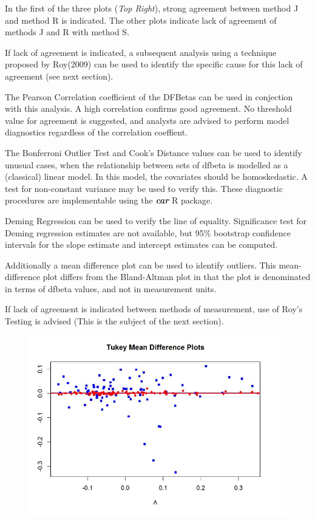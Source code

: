 \documentclass[12pt, a4paper]{report}
\theoremstyle{plain}
\theoremstyle{definition}
\theoremstyle{remark}
\begin{document}
	In the first of the three plots (\textit{Top Right}), strong agreement between method J and method R is indicated. The other plots indicate lack of agreement of methods J and R with method S.
	
	
	
	If lack of agreement is indicated, a subsequent analysis using a technique proposed by Roy(2009) can be used to identify the specific cause for this lack of agreement (see next section).
	
	
	The Pearson Correlation coefficient of the DFBetas can be used in conjection with this analysis. A high correlation confirms good agreement. No threshold value for agreement is suggested, and analysts are advised to perform model diagnostics regardless of the correlation coeffient.
	
	
	The Bonferroni Outlier Test and Cook's Distance values can be used to identify unusual cases, when the relationship between sets of dfbeta is modelled as a (classical) linear model. In this model, the covariates should be homoskedastic. A test for non-constant variance may be used to verify this. These diagnostic procedures are implementable using the \textbf{\textit{car}} R package.
	
	
	Deming Regression can be used to verify the line of equality. Significance test for Deming regression estimates are not available, but 95\% bootstrap confidence intervals for the slope estimate and intercept estimates can be computed.
	
	
	Additionally a mean difference plot can be used to identify outliers. This mean-difference plot differs from the Bland-Altman plot in that the plot is denominated in terms of dfbeta values, and not in measurement units.
	
	If lack of agreement is indicated between methods of measurement, use of Roy's Testing is advised (This is the subject of the next section).
	\begin{figure}[h!
		]
		\centering
		\includegraphics[width=0.7\linewidth]{images/04-TMDplot}
		
	\end{figure}
	
\end{document}
